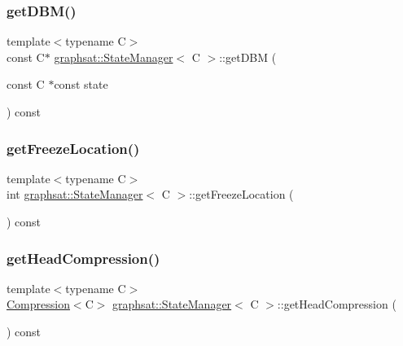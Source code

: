 \subsubsection{\texorpdfstring{getDBM()}{getDBM()}\hspace{0.1cm}{\footnotesize\ttfamily [2/2]}}
{\footnotesize\ttfamily template$<$typename C$>$ \\
const C$\ast$ \mbox{\hyperlink{classgraphsat_1_1_state_manager}{graphsat\+::\+State\+Manager}}$<$ C $>$\+::get\+D\+BM (\begin{DoxyParamCaption}\item[{const C $\ast$const}]{state }\end{DoxyParamCaption}) const\hspace{0.3cm}{\ttfamily [inline]}}

\mbox{\label{classgraphsat_1_1_state_manager_aa80aa713a0b3514795714ef6b859684c}} 
\subsubsection{\texorpdfstring{getFreezeLocation()}{getFreezeLocation()}}
{\footnotesize\ttfamily template$<$typename C$>$ \\
int \mbox{\hyperlink{classgraphsat_1_1_state_manager}{graphsat\+::\+State\+Manager}}$<$ C $>$\+::get\+Freeze\+Location (\begin{DoxyParamCaption}{ }\end{DoxyParamCaption}) const\hspace{0.3cm}{\ttfamily [inline]}}

\mbox{\label{classgraphsat_1_1_state_manager_a387d00e5d3cd6bd2362986f037dc926e}} 
\subsubsection{\texorpdfstring{getHeadCompression()}{getHeadCompression()}}
{\footnotesize\ttfamily template$<$typename C$>$ \\
\mbox{\hyperlink{classgraphsat_1_1_compression}{Compression}}$<$C$>$ \mbox{\hyperlink{classgraphsat_1_1_state_manager}{graphsat\+::\+State\+Manager}}$<$ C $>$\+::get\+Head\+Compression (\begin{DoxyParamCaption}{ }\end{DoxyParamCaption}) const\hspace{0.3cm}{\ttfamily [inline]}}

